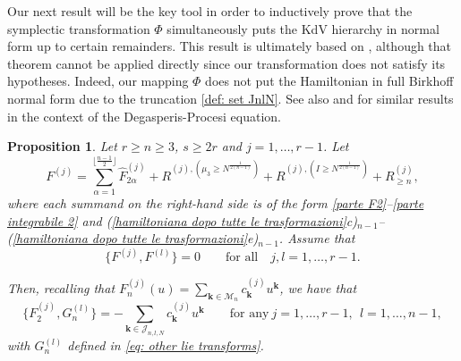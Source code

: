 \documentclass[a4paper,10pt,reqno]{article}
\theoremstyle{definition}
\theoremstyle{plain}
\theoremstyle{plain}
\theoremstyle{definition}
\theoremstyle{plain}
\theoremstyle{plain}
\newtheorem{prop}[definition]{Proposition}
\theoremstyle{plain}
\theoremstyle{definition}
\theoremstyle{definition}
\def \k{\bm{k}}
\begin{document}
Our next result will be the key tool in order to inductively prove that the symplectic transformation $\Phi$ simultaneously puts the KdV hierarchy in normal form up to certain remainders. This result is ultimately based on \cite[Theorem~G.2]{kappeler}, although that theorem cannot be applied directly since our transformation does not satisfy its hypotheses. Indeed, our mapping $\Phi$ does not put the Hamiltonian in full Birkhoff normal form due to the truncation \eqref{def: set JnlN}. See also \cite[Lemma~4.4]{feola} and \cite[Proposition~3.6]{feola2} for similar results in the context of the Degasperis-Procesi equation. 

\begin{prop} \label{prop: magic formula}
Let $r \ge n \ge 3$, $s \ge 2 r$ and $j = 1,\ldots,r-1$.
Let
\begin{equation}\label{eq: pre magic formula}
F^{(j)} = \sum_{\alpha = 1}^{\lfloor \frac{n-1}{2} \rfloor } \widehat{F}_{2\alpha}^{(j)} + R^{(j),(\mu_3 \ge N^{\frac{1}{2(n-1)}})} + R^{(j),(I \ge N^{\frac{1}{2(n-1)}})} + R_{\ge n}^{(j)},
\end{equation}
where each summand on the right-hand side is of the form \ref{parte F2}--\ref{parte integrabile 2} and (\ref{hamiltoniana dopo tutte le trasformazioni}c)$_{n-1}$--(\ref{hamiltoniana dopo tutte le trasformazioni}e)$_{n-1}$.
Assume that
\begin{equation} \label{eq: kdv hierarchy commutes induction}
\{ F^{(j)}  , F^{(l)}  \} = 0 \qquad \mbox{for all} \quad j,l=1,\ldots, r-1.
\end{equation}

\smallskip

Then, recalling that $F_n^{(j)}(u) = \sum_{\k\in\mathcal{M}_n} c_{\k}^{(j)} u^{\k}$, we have that
\begin{equation}
\{ F_2^{(j)} , G_{n}^{(l)} \} = - \sum_{\k \in \mathcal{J}_{n,l,N}} c_{\k}^{(j)} u^{\k} \qquad \mbox{for any}\ j = 1,\ldots,r-1,\ \ l = 1, \ldots , n-1 ,
\label{claim}
\end{equation}
with $G_{n}^{(l)}$ defined in \eqref{eq: other lie transforms}.
\end{prop}
\end{document}
